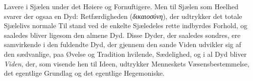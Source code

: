 \documentclass[12pt,a4paper]{book}
\newcommand{\gk}[1]{\textit{#1}}
\begin{document}
Lavere i Sjælen under det Høiere og Fornuftigere. Men til
Sjælen som Heelhed svarer der ogsaa en Dyd: Retfærdigheden
(\gk{δικαιοσύνη}), der udtrykker det totale Sjælelivs normale Til\-%
stand ved de enkelte Sjæledeles rette indbyrdes Forhold, og
saaledes bliver ligesom den almene Dyd. Disse Dyder, der
saaledes sondres, ere samvirkende i den fuldendte Dyd, der
gjennem den sande Viden udvikler sig af den sædvanlige, paa
Øvelse og Tradition hvilende, Sædelighed, og i al Dyd bliver
\emph{Viden}, der, som visende hen til Ideen, udtrykker Menneskets
Væsensbestemmelse, det egentlige Grundlag og det egentlige
Hegemoniske.
\end{document}
